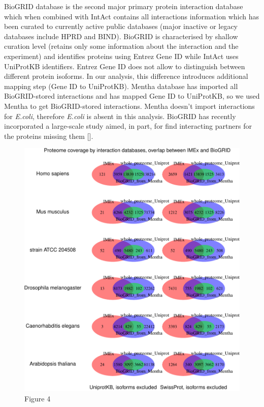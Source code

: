 \documentclass[]{article}
\begin{document}
BioGRID database is the second major primary protein interaction
database which when combined with IntAct contains all interactions
information which has been curated to currently active public databases
(major inactive or legacy databases include HPRD and BIND). BioGRID is
characterised by shallow curation level (retains only some information
about the interaction and the experiment) and identifies proteins using
Entrez Gene ID while IntAct uses UniProtKB identifiers. Entrez Gene ID
does not allow to distinguish between different protein isoforms. In our
analysis, this difference introduces additional mapping step (Gene ID to
UniProtKB). Mentha database has imported all BioGRID-stored interactions
and has mapped Gene ID to UniProtKB, so we used Mentha to get
BioGRID-stored interactions. Mentha doesn't import interactions for
\emph{E.coli}, therefore \emph{E.coli} is absent in this analysis.
BioGRID has recently incorporated a large-scale study aimed, in part,
for find interacting partners for the proteins missing them {[}{]}.

\begin{figure}[htbp]
\centering
\includegraphics{final_report_files/figure-latex/biogrid_vs_IMEx_vs_Uniprot_venndiagram-1.pdf}
\caption{Figure 4}
\end{figure}
\end{document}
